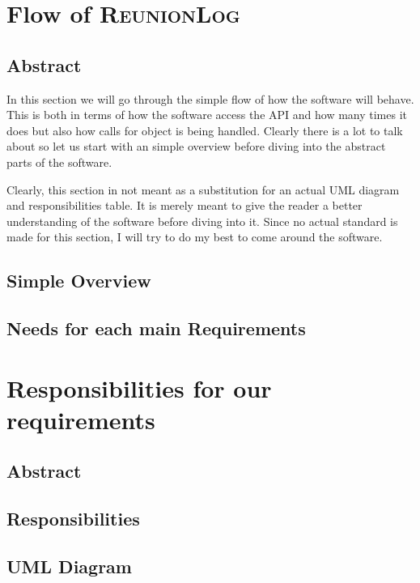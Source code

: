 \documentclass[10pt, a4paper]{memoir}
\numberwithin{equation}{section}
\theoremstyle{plain}
\theoremstyle{defp}
\theoremstyle{dotless}
\theoremstyle{definition}
\theoremstyle{dotless}
\theoremstyle{dotless}
\theoremstyle{defp}
\theoremstyle{defp}
\theoremstyle{be}          %
\theoremstyle{defp}
\begin{document}
\newpage

\chapter{Flow of \textsc{ReunionLog}}

\section*{Abstract}

In this section we will go through the simple flow of how the software will behave. This is both in terms of how the software access the API and how many times it does but also how calls for object is being handled. Clearly there is a lot to talk about so let us start with an simple overview before diving into the abstract parts of the software.

\medskip

Clearly, this section in not meant as a substitution for an actual UML diagram and responsibilities table. It is merely meant to give the reader a better understanding of the software before diving into it. Since no actual standard is made for this section, I will try to do my best to come around the software.


\section{Simple Overview}

\section{Needs for each main Requirements}

\newpage

\chapter{Responsibilities for our requirements}

\section*{Abstract}

\section{Responsibilities}

\section{\textsc{UML} Diagram}
\end{document}
